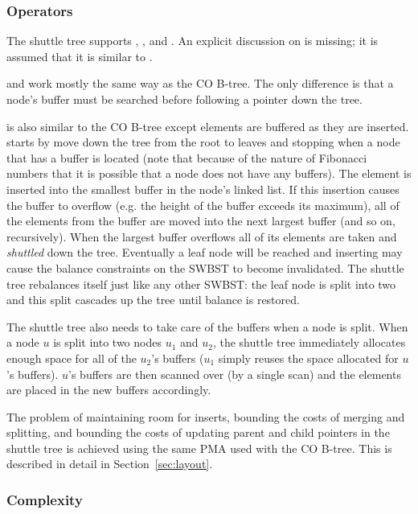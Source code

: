 \documentclass[preprint]{style}
\begin{document}
\subsubsection{Operators}

The shuttle tree supports \Search{}, \Insert{}, and \Scan{}. An explicit
discussion on \Delete{} is missing; it is assumed that it is similar 
to \Insert{}.

\Search{} and \Scan{} work mostly the same way as the CO B-tree. The only
difference is that a node's buffer must be searched before following a
pointer down the tree.

\Insert{} is also similar to the CO B-tree except elements are buffered as they
are inserted. \Insert{} starts by move down the tree from the root to leaves
and stopping when a node that has a buffer is located (note that because of the
nature of Fibonacci numbers that it is possible that a node does not have any
buffers). The element is inserted into the smallest buffer in the node's linked
list. If this insertion causes the buffer to overflow (e.g. the height of the
buffer exceeds its maximum), all of the elements from the buffer are moved into
the next largest buffer (and so on, recursively).  When the largest buffer
overflows all of its elements are taken and \textit{shuttled} down the tree.
Eventually a leaf node will be reached and inserting may cause the balance
constraints on the SWBST to become invalidated. The shuttle tree rebalances
itself just like any other SWBST: the leaf node is split into two and this
split cascades up the tree until balance is restored.

The shuttle tree also needs to take care of the buffers when a node is split.
When a node $u$ is split into two nodes $u_1$ and $u_2$, the shuttle tree
immediately allocates enough space for all of the $u_2$'s buffers ($u_1$ simply
reuses the space allocated for $u$'s buffers). $u$'s buffers are then scanned
over (by a single scan) and the elements are placed in the new buffers
accordingly.

The problem of maintaining room for inserts, bounding the costs of
merging and splitting, and bounding the costs of updating parent and child
pointers in the shuttle tree is achieved using the same PMA used with the CO
B-tree. This is described in detail in Section~\ref{sec:layout}.

\subsubsection{Complexity}
\end{document}
